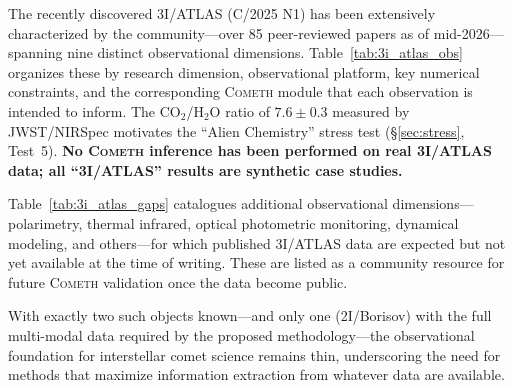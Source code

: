 \documentclass[usenatbib]{mnras}
\begin{document}
The recently discovered 3I/ATLAS (C/2025 N1) has been extensively characterized by the community---over 85 peer-reviewed papers as of mid-2026---spanning nine distinct observational dimensions. Table~\ref{tab:3i_atlas_obs} organizes these by research dimension, observational platform, key numerical constraints, and the corresponding \textsc{Cometh} module that each observation is intended to inform. The CO$_2$/H$_2$O ratio of $7.6 \pm 0.3$ measured by JWST/NIRSpec \citep{cordiner25} motivates the ``Alien Chemistry'' stress test (\S\ref{sec:stress}, Test~5). \textbf{No \textsc{Cometh} inference has been performed on real 3I/ATLAS data; all ``3I/ATLAS'' results are synthetic case studies.}

Table~\ref{tab:3i_atlas_gaps} catalogues additional observational dimensions---polarimetry, thermal infrared, optical photometric monitoring, dynamical modeling, and others---for which published 3I/ATLAS data are expected but not yet available at the time of writing. These are listed as a community resource for future \textsc{Cometh} validation once the data become public.

With exactly two such objects known---and only one (2I/Borisov) with the full multi-modal data required by the proposed methodology---the observational foundation for interstellar comet science remains thin, underscoring the need for methods that maximize information extraction from whatever data are available.
\end{document}
